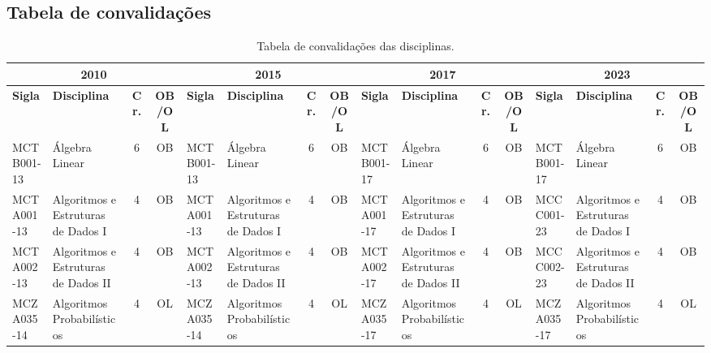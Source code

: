 \documentclass[a4paper]{article}
\begin{document}
\subsection{Tabela de convalidações}
\label{subsec:convalidacoes}

\begin{landscape}
{\footnotesize
\begin{longtable}{|l|p{.15\textheight}|c|c||l|p{.15\textheight}|c|c||l|p{.15\textheight}|c|c||l|p{.15\textheight}|c|c|}
    \caption{Tabela de convalidações das disciplinas.}
    \label{tab:convalidacoes_obrigatorias} \\

    \hline
    \multicolumn{4}{|c||}{\bf 2010} &
    \multicolumn{4}{|c|}{\bf 2015} &
    \multicolumn{4}{|c||}{\bf 2017} &
    \multicolumn{4}{|c|}{\bf 2023} \\ 
    \hline
    
    \textbf{Sigla} & \textbf{Disciplina} & \textbf{Cr.} & \textbf{OB/OL} &
    \textbf{Sigla} & \textbf{Disciplina} & \textbf{Cr.} & \textbf{OB/OL} &
    \textbf{Sigla} & \textbf{Disciplina} & \textbf{Cr.} & \textbf{OB/OL} &
    \textbf{Sigla} & \textbf{Disciplina} & \textbf{Cr.} & \textbf{OB/OL} \\
    \hline\hline
    
    MCTB001-13 & Álgebra Linear & 6 & OB &
    MCTB001-13 & Álgebra Linear & 6 & OB &
    MCTB001-17 & Álgebra Linear & 6 & OB &
    MCTB001-17 & Álgebra Linear & 6 & OB \\ \hline

    MCTA001-13 & Algoritmos e Estruturas de Dados I & 4 & OB &
    MCTA001-13 & Algoritmos e Estruturas de Dados I & 4 & OB &
    MCTA001-17 & Algoritmos e Estruturas de Dados I & 4 & OB &
    MCCC001-23 & Algoritmos e Estruturas de Dados I & 4 & OB  \\ \hline

    MCTA002-13 & Algoritmos e Estruturas de Dados II & 4 & OB &
    MCTA002-13 & Algoritmos e Estruturas de Dados II & 4 & OB & 
    MCTA002-17 & Algoritmos e Estruturas de Dados II & 4 & OB & 
    MCCC002-23 & Algoritmos e Estruturas de Dados II & 4 & OB  \\ \hline

    MCZA035-14 & Algoritmos Probabilísticos & 4 & OL &
    MCZA035-14 & Algoritmos Probabilísticos & 4 & OL &
    MCZA035-17 & Algoritmos Probabilísticos & 4 & OL &
    MCZA035-17 & Algoritmos Probabilísticos & 4 & OL \\ \hline


\end{longtable}}
\end{landscape}
\end{document}
